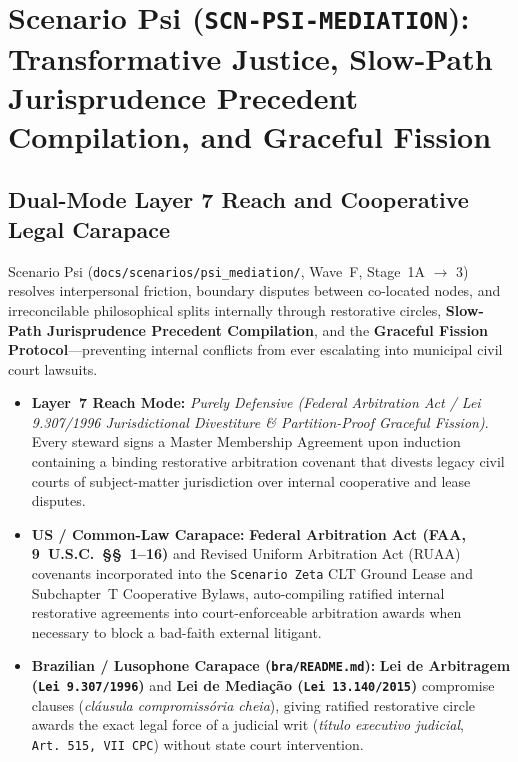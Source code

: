 \chapter{Scenario Psi (\texttt{SCN-PSI-MEDIATION}): Transformative Justice, Slow-Path Jurisprudence Precedent Compilation, and Graceful Fission}
\label{app:scenario-psi}

\section{Dual-Mode Layer 7 Reach and Cooperative Legal Carapace}
Scenario Psi (\texttt{docs/scenarios/psi\_mediation/}, Wave~F, Stage~1A $\to$ 3) resolves interpersonal friction, boundary disputes between co-located nodes, and irreconcilable philosophical splits internally through restorative circles, \textbf{Slow-Path Jurisprudence Precedent Compilation}, and the \textbf{Graceful Fission Protocol}---preventing internal conflicts from ever escalating into municipal civil court lawsuits.
\begin{itemize}
    \item \textbf{Layer~7 Reach Mode:} \textit{Purely Defensive (Federal Arbitration Act / Lei 9.307/1996 Jurisdictional Divestiture \& Partition-Proof Graceful Fission)}. Every steward signs a Master Membership Agreement upon induction containing a binding restorative arbitration covenant that divests legacy civil courts of subject-matter jurisdiction over internal cooperative and lease disputes.
    \item \textbf{US / Common-Law Carapace:} \textbf{Federal Arbitration Act (FAA, 9~U.S.C.~\S\S~1--16)} \parencite{faa1925} and Revised Uniform Arbitration Act (RUAA) covenants incorporated into the \texttt{Scenario Zeta} CLT Ground Lease and Subchapter~T Cooperative Bylaws, auto-compiling ratified internal restorative agreements into court-enforceable arbitration awards when necessary to block a bad-faith external litigant.
    \item \textbf{Brazilian / Lusophone Carapace (\texttt{bra/README.md}):} \textbf{Lei de Arbitragem (\texttt{Lei 9.307/1996})} and \textbf{Lei de Media{\c{c}}{\~a}o (\texttt{Lei 13.140/2015})} compromise clauses (\textit{cl{\'a}usula compromiss{\'o}ria cheia}), giving ratified restorative circle awards the exact legal force of a judicial writ (\textit{t{\'\i}tulo executivo judicial}, \texttt{Art.~515, VII CPC}) without state court intervention.
\end{itemize}

